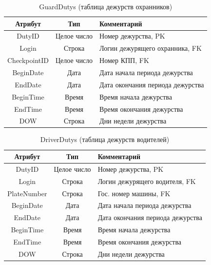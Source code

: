 \begin{table}[h!] \label{gduty_table}
	\begin{center}
		\caption{GuardDutys (таблица дежурств охранников)}
		\begin{tabular}{| c | c | p{10cm} |}
			\hline
			\textbf{Атрибут}		&	\textbf{Тип}		& \textbf{Комментарий} \\
			\hline
			DutyID		&	Целое число	&	Номер дежурства, PK \\ \hline
			Login 		&	Строка		&	Логин дежурящего охранника, FK \\ \hline
			CheckpointID &	Целое число	&	Номер КПП, FK \\ \hline
			BeginDate 	&	Дата		&	Дата начала периода дежурства \\ \hline
			EndDate 	&	Дата		&	Дата окончания периода дежурства \\ \hline
			BeginTime 	&	Время		&	Время начала дежурства \\ \hline
			EndTime 	&	Время		&	Время окончания дежурства \\ \hline
			DOW 		&	Строка		&	Дни недели дежурства \\ \hline
		\end{tabular}
	\end{center}
\end{table}

\begin{table}[h!] \label{dduty_table}
	\begin{center}
		\caption{DriverDutys (таблица дежурств водителей)}
		\begin{tabular}{| c | c | p{10cm} |}
			\hline
			\textbf{Атрибут}		&	\textbf{Тип}		& \textbf{Комментарий} \\
			\hline
			DutyID		&	Целое число	&	Номер дежурства, PK \\ \hline
			Login 		&	Строка		&	Логин дежурящего водителя, FK \\ \hline
			PlateNumber &	Строка		&	Гос. номер машины, FK \\ \hline
			BeginDate 	&	Дата		&	Дата начала периода дежурства \\ \hline
			EndDate 	&	Дата		&	Дата окончания периода дежурства \\ \hline
			BeginTime 	&	Время		&	Время начала дежурства \\ \hline
			EndTime 	&	Время		&	Время окончания дежурства \\ \hline
			DOW 		&	Строка		&	Дни недели дежурства \\ \hline
		\end{tabular}
	\end{center}
\end{table}


